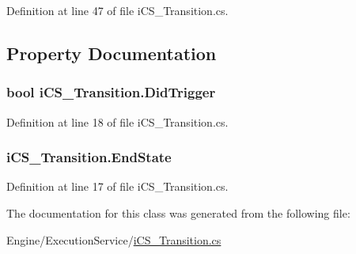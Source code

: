 Definition at line 47 of file i\+C\+S\+\_\+\+Transition.\+cs.



\subsection{Property Documentation}
\hypertarget{classi_c_s___transition_a24426d49439effbd9f7bbea9ea0615ab}{
\subsubsection[{Did\+Trigger}]{\setlength{\rightskip}{0pt plus 5cm}bool i\+C\+S\+\_\+\+Transition.\+Did\+Trigger\hspace{0.3cm}{\ttfamily [get]}}}\label{classi_c_s___transition_a24426d49439effbd9f7bbea9ea0615ab}


Definition at line 18 of file i\+C\+S\+\_\+\+Transition.\+cs.

\hypertarget{classi_c_s___transition_aaa771f098e26641c45bd0251a720491f}{
\subsubsection[{End\+State}]{ i\+C\+S\+\_\+\+Transition.\+End\+State\hspace{0.3cm}{\ttfamily [get]}}}\label{classi_c_s___transition_aaa771f098e26641c45bd0251a720491f}


Definition at line 17 of file i\+C\+S\+\_\+\+Transition.\+cs.



The documentation for this class was generated from the following file\+:\begin{DoxyCompactItemize}
\item 
Engine/\+Execution\+Service/\hyperlink{i_c_s___transition_8cs}{i\+C\+S\+\_\+\+Transition.\+cs}\end{DoxyCompactItemize}
